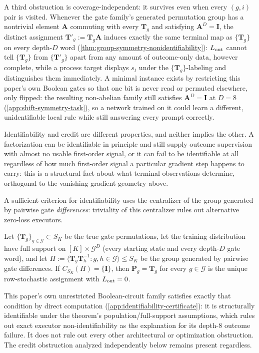 A third obstruction is coverage-independent: it survives even when every
$(g,i)$ pair is visited. Whenever the gate family's generated permutation
group has a nontrivial element $\bm A$ commuting with every $\bm T_g$ and
satisfying $\bm A^D=\bm I$, the distinct assignment
$\bm T'_g:=\bm T_g\bm A$ induces exactly the same terminal map as
$\{\bm T_g\}$ on every depth-$D$ word
(\cref{thm:group-symmetry-nonidentifiability}): $L_{\rm out}$ cannot tell
$\{\bm T_g\}$ from $\{\bm T'_g\}$ apart from any amount of outcome-only
data, however complete, while a process target displays $s_t$ under the
$\{\bm T_g\}$-labeling and distinguishes them immediately. A minimal
instance exists by restricting this paper's own Boolean gates so that one
bit is never read or permuted elsewhere, only flipped: the resulting
non-abelian family still satisfies $\bm A^D=\bm I$ at $D=8$
(\cref{app:shift-symmetry-task}), so a network trained on it could learn a
different, unidentifiable local rule while still answering every prompt
correctly.

Identifiability and credit are different properties, and neither implies
the other. A factorization can be identifiable in principle and still
supply outcome supervision with almost no usable first-order signal, or
it can fail to be identifiable at all regardless of how much first-order
signal a particular gradient step happens to carry: this is a structural
fact about what terminal observations determine, orthogonal to the
vanishing-gradient geometry above.

A sufficient criterion for identifiability uses the centralizer of the
group generated by pairwise gate \emph{differences}: triviality of this
centralizer rules out alternative zero-loss executors.

\begin{theorem}
\label{thm:fixed-depth-identifiability}
Let $\{\bm T_g\}_{g\in\mathcal G}\subset S_K$ be the true gate permutations,
let the training distribution have full support on $[K]\times\mathcal G^D$
(every starting state and every depth-$D$ gate word), and let
$H:=\bigl\langle \bm T_g\bm T_h^{-1}: g,h\in\mathcal G\bigr\rangle\le S_K$
be the group generated by pairwise gate differences. If $C_{S_K}(H)=\{\bm I\}$,
then $\bm P_g=\bm T_g$ for every $g\in\mathcal G$ is the unique row-stochastic
assignment with $L_{\rm out}=0$.
\end{theorem}

This paper's own unrestricted Boolean-circuit family satisfies exactly
that condition by direct computation
(\cref{app:identifiability-certificate}): it is structurally identifiable
under the theorem's population/full-support assumptions, which rules out
exact executor non-identifiability as the explanation for its depth-$8$
outcome failure. It does not rule out every other architectural or
optimization obstruction. The credit obstruction analyzed independently
below remains present regardless.

